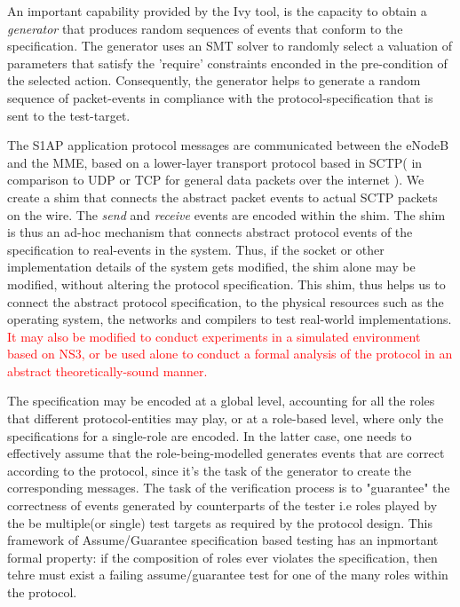 \documentclass[acmsmall,review,authorversion]{acmart}
\begin{document}
An important capability provided by the Ivy tool, is the capacity to obtain a \textit{generator} that produces random sequences of events that conform to the specification. The generator uses an SMT solver to randomly select a valuation of parameters that satisfy the 'require' constraints enconded in the pre-condition of the selected action. Consequently, the generator helps to generate a random sequence of packet-events in compliance with the protocol-specification that is sent to the test-target. 

The S1AP application protocol messages are communicated between the eNodeB and the MME, based on a lower-layer transport protocol based in SCTP( in comparison to UDP or TCP for general data packets over the internet ). We create a shim that connects the abstract packet events to actual SCTP packets on the wire. The \textit{send} and \textit{receive} events are encoded within the shim. The shim is thus an ad-hoc mechanism that connects abstract protocol events of the specification to real-events in the system. Thus, if the socket or other implementation details of the system gets modified, the shim alone may be modified, without altering the protocol specification. This shim, thus helps us to connect the abstract protocol specification, to the physical resources such as the operating system, the networks and compilers to test real-world implementations. \textcolor{red}{It may also be modified to conduct experiments in a simulated environment based on NS3, or be used alone to conduct a formal analysis of the protocol in an abstract theoretically-sound manner. }

The specification may be encoded at a global level, accounting for all the roles that different protocol-entities may play, or at a role-based level, where only the specifications for a single-role are encoded. In the latter case, one needs to effectively assume that the role-being-modelled generates events that are correct according to the protocol, since it's the task of the generator to create the corresponding messages. The task of the verification process is to "guarantee" the correctness of events generated by counterparts of the tester i.e roles played by the be multiple(or single) test targets as required by the protocol design. This framework of Assume/Guarantee specification based testing has an inpmortant formal property: if the composition of roles ever violates the specification, then tehre must exist a failing assume/guarantee test for one of the many roles within the protocol. 
\end{document}
